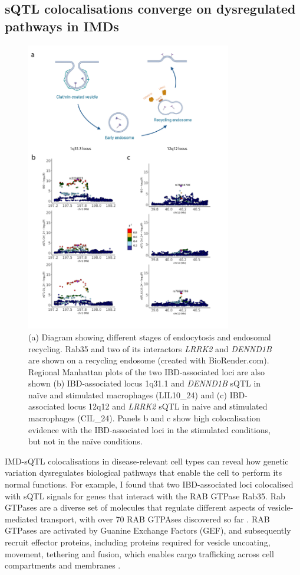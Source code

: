 \subsection{sQTL colocalisations converge on dysregulated pathways in IMDs}
\begin{figure}
  \centering
  \includegraphics[width=0.8\textwidth]{dennd1b}
  \caption[Colocalisation of \textit{DENND1B} and \textit{LRRK2} sQTLs with IBD-associated loci]{(a) Diagram showing different stages of endocytosis and endosomal recycling. Rab35 and two of its interactors \textit{LRRK2} and \textit{DENND1B} are shown on a recycling endosome (created with BioRender.com). Regional Manhattan plots of the two IBD-associated loci are also shown (b) IBD-associated locus 1q31.1 and \textit{DENND1B} sQTL in naïve and stimulated macrophages (LIL10\_24) and (c) IBD-associated locus  12q12 and \textit{LRRK2} sQTL in naive and stimulated macrophages (CIL\_24). Panels b and c show high colocalisation evidence with the IBD-associated loci in the stimulated conditions, but not in the naïve conditions.}
  \label{fig:dennd1b}   
\end{figure}
IMD-sQTL colocalisations in disease-relevant cell types can reveal how genetic variation dysregulates biological pathways that enable the cell to perform its normal functions.
For example, I found that two IBD-associated loci colocalised with sQTL signals for genes that interact with the RAB GTPase Rab35. Rab GTPases are a diverse set of molecules that regulate different aspects of vesicle-mediated transport, with over 70 RAB GTPAses discovered so far \cite{Sigismund2021-cu}. RAB GTPases are activated by Guanine Exchange Factors (GEF), and subsequently recruit effector proteins, including proteins required for vesicle uncoating, movement, tethering and fusion, which enables cargo trafficking across cell compartments and membranes \cite{Yoneyama2005-ba}.\\

